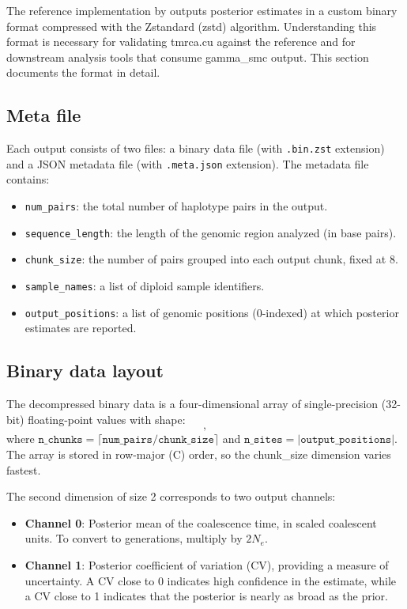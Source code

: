 \documentclass[10pt,letterpaper]{article}
\begin{document}
The reference implementation by \citet{Schweiger2023} outputs posterior estimates in a custom binary format compressed with the Zstandard (zstd) algorithm. Understanding this format is necessary for validating tmrca.cu against the reference and for downstream analysis tools that consume gamma\_smc output. This section documents the format in detail.

\subsection{Meta file}

Each output consists of two files: a binary data file (with \texttt{.bin.zst} extension) and a JSON metadata file (with \texttt{.meta.json} extension). The metadata file contains:
\begin{itemize}
\item \texttt{num\_pairs}: the total number of haplotype pairs in the output.
\item \texttt{sequence\_length}: the length of the genomic region analyzed (in base pairs).
\item \texttt{chunk\_size}: the number of pairs grouped into each output chunk, fixed at 8.
\item \texttt{sample\_names}: a list of diploid sample identifiers.
\item \texttt{output\_positions}: a list of genomic positions (0-indexed) at which posterior estimates are reported.
\end{itemize}

\subsection{Binary data layout}

The decompressed binary data is a four-dimensional array of single-precision (32-bit) floating-point values with shape:
\begin{equation}
[\texttt{n\_chunks}, \; 2, \; \texttt{n\_sites}, \; \texttt{chunk\_size}],
\end{equation}
where $\texttt{n\_chunks} = \lceil \texttt{num\_pairs} / \texttt{chunk\_size} \rceil$ and $\texttt{n\_sites} = |\texttt{output\_positions}|$. The array is stored in row-major (C) order, so the chunk\_size dimension varies fastest.

The second dimension of size 2 corresponds to two output channels:
\begin{itemize}
\item \textbf{Channel 0}: Posterior mean of the coalescence time, in scaled coalescent units. To convert to generations, multiply by $2N_e$.
\item \textbf{Channel 1}: Posterior coefficient of variation (CV), providing a measure of uncertainty. A CV close to 0 indicates high confidence in the estimate, while a CV close to 1 indicates that the posterior is nearly as broad as the prior.
\end{itemize}
\end{document}
